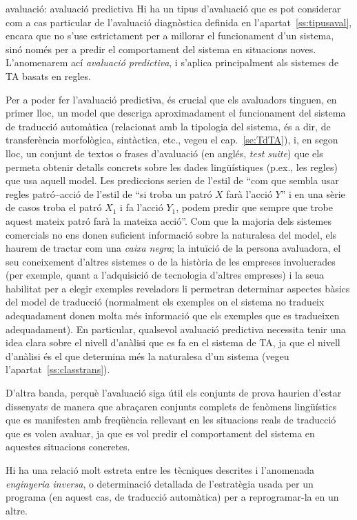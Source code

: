 \begin{persabermes}{avaluació: avaluació predictiva}
  Hi ha un tipus d'avaluació que es pot considerar com a cas
  particular de l'avaluació diagnòstica definida en
  l'apartat~\ref{ss:tipusaval}, encara que no s'use estrictament per a
  millorar el funcionament d'un sistema, sinó només per a predir el
  comportament del sistema en situacions noves.  L'anomenarem ací
  \emph{avaluació predictiva}, i s'aplica principalment als sistemes
  de TA basats en regles.

  Per a poder fer l'avaluació predictiva, és crucial que els
  avaluadors tinguen, en primer lloc, un model que descriga
  aproximadament el funcionament del sistema de traducció automàtica
  (relacionat amb la tipologia del sistema, és a dir, de transferència
  morfològica, sintàctica, etc., vegeu el cap.~\ref{se:TdTA}), i, en
  segon lloc, un conjunt de textos o frases d'avaluació (en anglés,
  \emph{test suite}) que els permeta obtenir detalls concrets sobre
  les dades lingüístiques (p.ex., les regles) que usa aquell model.
  Les prediccions serien de l'estil de ``com que sembla usar regles
  patró--acció de l'estil de ``si troba un patró $X$ farà l'acció
  $Y$'' i en una sèrie de casos troba el patró $X_1$ i fa l'acció
  $Y_1$, podem predir que sempre que trobe aquest mateix patró farà la
  mateixa acció''. Com que la majoria dels sistemes comercials no ens
  donen suficient informació sobre la naturalesa del model, els haurem
  de tractar com una \emph{caixa negra}; la intuïció de la persona
  avaluadora, el seu coneixement d'altres sistemes o de la història de
  les empreses involucrades (per exemple, quant a l'adquisició de
  tecnologia d'altres empreses) i la seua habilitat per a elegir
  exemples reveladors li permetran determinar aspectes bàsics del
  model de traducció (normalment els exemples on el sistema no
  tradueix adequadament donen molta més informació que els exemples
  que es tradueixen adequadament). En particular, qualsevol avaluació
  predictiva necessita tenir una idea clara sobre el nivell d'anàlisi
  que es fa en el sistema de TA, ja que el nivell d'anàlisi és el que
  determina més la naturalesa d'un sistema (vegeu
  l'apartat~\ref{ss:classtrans}).

  D'altra banda, perquè l'avaluació siga útil els conjunts de prova
  haurien d'estar dissenyats de manera que abraçaren conjunts complets
  de fenòmens lingüístics que es manifesten amb freqüència rellevant
  en les situacions reals de traducció que es volen avaluar, ja que es
  vol predir el comportament del sistema en aquestes situacions
  concretes.

  Hi ha una relació molt estreta entre les tècniques descrites i
  l'anomenada \emph{enginyeria inversa}, o determinació detallada de
  l'estratègia usada per un programa (en aquest cas, de traducció
  automàtica) per a reprogramar-la en un altre.
\end{persabermes}


